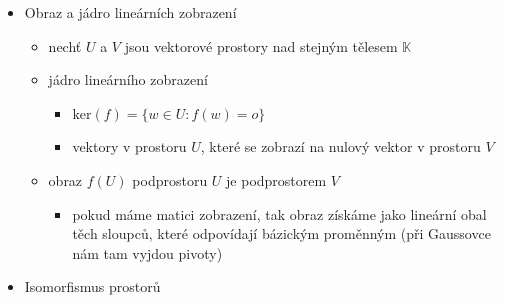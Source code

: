 \begin{itemize}
\begin{itemize}
\begin{itemize}
\end{itemize}
\item matice složeného zobrazení
\begin{itemize}
\item mějme vektorové prostory $U,V,W$ s konečnými uspořádanými bázemi $B,C,D$
\item pro matice lineárních zobrazení $f:U\to V$ a $g:V\to W$ platí vztah $[g\circ f]_{B,D}=[g]_{C,D}[f]_{B,C}$
\item je to hezčí, když použijeme Hladíkovo značení: ${}_D[g\circ f]_B={}_D[g]_C\cdot{}_C[f]_B$
\end{itemize}
\item matice přechodu
\begin{itemize}
\item nechť $X$ a $Y$ jsou dvě konečné báze vektorového prostoru $U$
\item matice přechodu od $X$ k $Y$ je $[id]_{X,Y}$
\item pro $u \in U$ tedy platí, že $[u]_Y=[id(u)]_Y=[id]_{X,Y}[u]_X$
\item matice přechodu je regulární, platí $[id]_{Y,X}=([id]_{X,Y})^{-1}$
\item výpočet: $[id]_{X,Y}=Y^{-1}X$ nebo také $(Y|X)\sim\sim(I_n|[id]_{X,Y})$
\end{itemize}
\end{itemize}
\item Obraz a jádro lineárních zobrazení
\begin{itemize}
\item nechť $U$ a $V$ jsou vektorové prostory nad stejným tělesem $\mathbb K$
\item jádro lineárního zobrazení
\begin{itemize}
\item $\text{ker}(f)=\lbrace w \in U:f(w)=o\rbrace$
\item vektory v prostoru $U$, které se zobrazí na nulový vektor v prostoru $V$
\end{itemize}
\item obraz $f(U)$ podprostoru $U$ je podprostorem $V$
\begin{itemize}
\item pokud máme matici zobrazení, tak obraz získáme jako lineární obal těch sloupců, které odpovídají bázickým proměnným (při Gaussovce nám tam vyjdou pivoty)
\end{itemize}
\end{itemize}
\item Isomorfismus prostorů
\begin{itemize}

\end{itemize}
\end{itemize}
